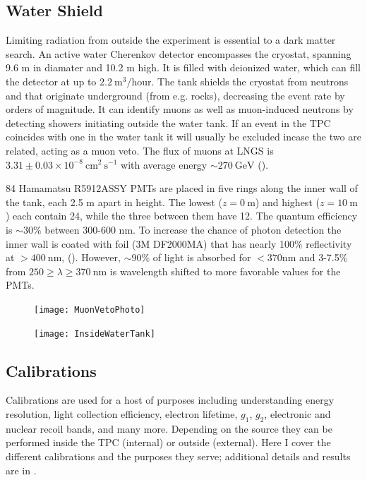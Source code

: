 \subsection{Water Shield}
\label{subsec:xenon1t_water_shield}
Limiting radiation from outside the experiment is essential to a dark matter search.  An active water Cherenkov detector encompasses the
cryostat, spanning 9.6 m in diamater and 10.2 m high.  It is filled with deionized water, which can fill the detector at up to
$2.2\ \mathrm{m^{3}/hour}$.  The tank shields the cryostat from neutrons and \gammarays that originate underground (from e.g. rocks),
decreasing the event rate by orders of magnitude.  It can identify muons as well as muon-induced neutrons by detecting showers initiating
outside the water tank.  If an event in the TPC coincides with one in the water tank it will usually be excluded incase the two are
related, acting as a muon veto.  The flux of muons at LNGS is $3.31 \pm 0.03 \times 10^{-8}\ \mathrm{cm^2\ s^{-1}}$ with average energy
${\sim}270\ \mathrm{GeV}$ ().

84 Hamamatsu R5912ASSY PMTs are placed in five rings along the inner wall of the tank, each 2.5 m apart in height.  The lowest
($z = 0\ \mathrm{m}$) and highest ($z = 10\ \mathrm{m}$) each contain 24, while the three between them have 12.  The quantum efficiency
is ${\sim}30\%$ between 300-600 nm.  To increase the chance of photon detection the inner wall is coated with foil (3M DF2000MA) that has
nearly 100\% reflectivity at $> 400\ \mathrm{nm}$, ().  However, ${\sim}90\%$ of light is absorbed for $<370 \mathrm{nm}$
and 3-7.5\% from $250 \geq \lambda \geq 370\ \mathrm{nm}$ is wavelength shifted to more favorable values for the PMTs.

\begin{figure}
\centering
\texttt{[image: MuonVetoPhoto]}
\label{fig:xenon1t_water_shield_photo}
\end{figure}

\begin{figure}
\centering
\texttt{[image: InsideWaterTank]}
\label{fig:xenon1t_water_shield_interior}
\end{figure}



\subsection{Calibrations}
\label{subsec:xenon1t_calibrations}
Calibrations are used for a host of purposes including understanding energy resolution, light collection efficiency, electron lifetime,
$g_1$, $g_2$, electronic and nuclear recoil bands, and many more.  Depending on the source they can be performed inside the TPC (internal) or
outside (external).  Here I cover the different calibrations and the purposes they serve; additional details and results are in
.

